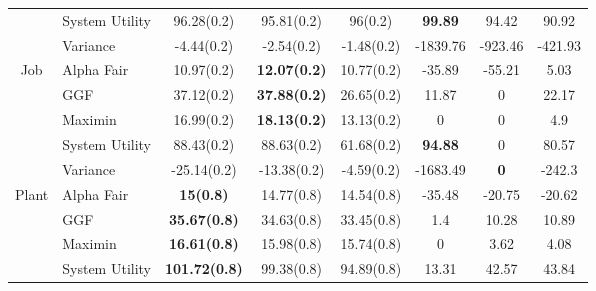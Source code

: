 \begin{table*}[t]
{\begin{tabular}{clcccccc}
                                         & System Utility  & 96.28(0.2)           & 95.81(0.2)            & 96(0.2)              & \textbf{99.89} & 94.42                        & 90.92              \\
                                         & Variance        & -4.44(0.2)           & -2.54(0.2)            & -1.48(0.2)           & -1839.76       & -923.46                      & -421.93            \\
\hline
\multirow{5}{*}{Job}                & Alpha Fair      & 10.97(0.2)           & \textbf{12.07(0.2)}   & 10.77(0.2)           & -35.89         & -55.21                       & 5.03               \\
                                         & GGF             & 37.12(0.2)           & \textbf{37.88(0.2)}   & 26.65(0.2)           & 11.87          & 0                            & 22.17              \\
                                         & Maximin         & 16.99(0.2)           & \textbf{18.13(0.2)}   & 13.13(0.2)           & 0              & 0                            & 4.9                \\
                                         & System Utility  & 88.43(0.2)           & 88.63(0.2)            & 61.68(0.2)           & \textbf{94.88} & 0                            & 80.57              \\
                                         & Variance        & -25.14(0.2)          & -13.38(0.2)           & -4.59(0.2)           & -1683.49       & \textbf{0}                   & -242.3             \\
\hline
\multirow{5}{*}{Plant}                   & Alpha Fair      & \textbf{15(0.8)}     & 14.77(0.8)            & 14.54(0.8)           & -35.48         & -20.75                       & -20.62             \\
                                         & GGF             & \textbf{35.67(0.8)}  & 34.63(0.8)            & 33.45(0.8)           & 1.4            & 10.28                        & 10.89              \\
                                         & Maximin         & \textbf{16.61(0.8)}  & 15.98(0.8)            & 15.74(0.8)           & 0              & 3.62                         & 4.08               \\
                                         & System Utility  & \textbf{101.72(0.8)} & 99.38(0.8)            & 94.89(0.8)           & 13.31          & 42.57                        & 43.84              \\

\end{tabular}}
\end{table*}
